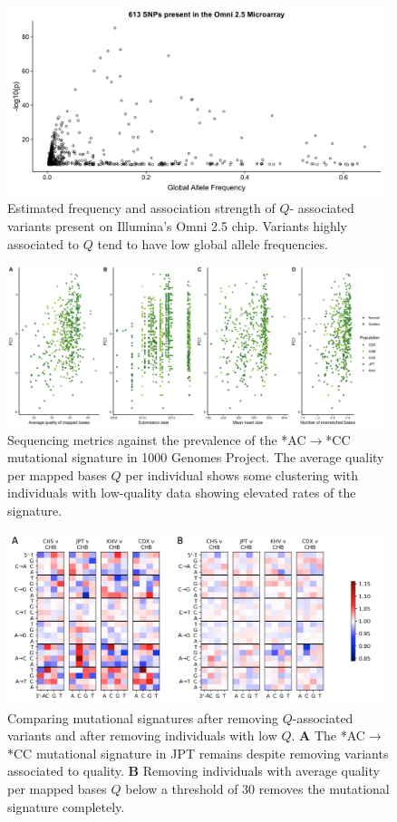 \documentclass[9pt,lineno]{template}
\begin{document}
\begin{figure}[tbp]
\includegraphics[width=11cm,keepaspectratio]{../Figures/Omni_AF.jpg}
\caption{Estimated frequency and association strength of $Q$- associated variants present on Illumina's Omni 2.5 chip. Variants highly associated to $Q$ tend to have low global allele frequencies.}
\label{Omni}
\end{figure}

\begin{figure}[tbp]
\includegraphics[width=11cm,keepaspectratio]{../Figures/PC1_Correlation.jpg}
\caption{Sequencing metrics against the prevalence of the  *AC${\rightarrow}$*CC mutational signature in 1000 Genomes Project. 
The average quality per mapped bases $Q$ per individual shows some clustering with individuals with low-quality data showing elevated rates of the signature.  }
\label{PC1_Correlation}
\end{figure}

\begin{figure}[tbp]
\includegraphics[width=11cm,keepaspectratio]{../Figures/MutationSpectrum_cutOff.png}
\caption{Comparing mutational signatures after removing $Q$-associated variants and after removing individuals with low $Q$.  
\textbf{A} 
The  *AC${\rightarrow}$*CC mutational signature in JPT remains despite removing variants associated to quality.
\textbf{B} 
Removing individuals with average quality per mapped bases $Q$ below a threshold of 30 removes the mutational signature completely. }
\label{MutSpect}
\end{figure}
\end{document}
